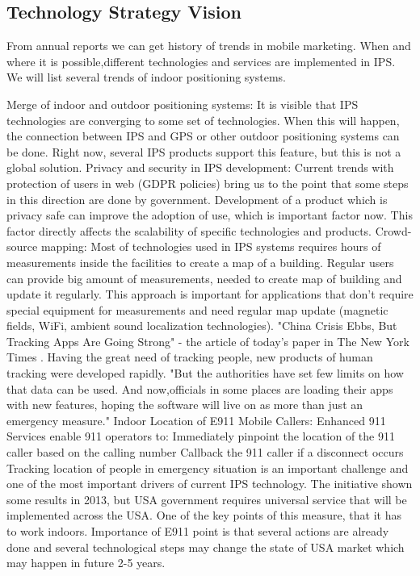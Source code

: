 


\subsection{Technology Strategy Vision}


From annual reports\cite{trends2017,trends2019} we can get history of trends in mobile marketing. When and where it is possible,different technologies and services are implemented in IPS. We will list several trends of indoor positioning systems.


Merge of indoor and outdoor positioning systems:
It is visible that IPS technologies are converging to some set of technologies. When this will happen, the connection between IPS and GPS or other outdoor positioning systems can be done. Right now, several IPS products support this feature, but this is not a global solution.\cite{Brena2017}
Privacy and security in IPS development:
Current trends with protection of users in web (GDPR policies) bring us to the point that some steps in this direction are done by government. Development of a product which is privacy safe can improve the adoption of use, which is important factor now. This factor directly affects the scalability of specific technologies and products.\cite{Brena2017}
Crowd-source mapping:
Most of technologies used in IPS systems requires hours of measurements inside the facilities to create a map of a building. Regular users can provide big amount of measurements, needed to create map of building and update it regularly.  This approach is important for applications that don't require special equipment for measurements and need regular map update (magnetic fields, WiFi, ambient sound localization technologies).\cite{Brena2017}
"China Crisis Ebbs, But Tracking Apps Are Going Strong" - the article of today's paper in The New York Times \cite{Tracking_Apps_times}.
Having the great need of tracking people, new products of human tracking were developed rapidly. "But the authorities have set few limits on how that data can be used. And now,officials in some places are loading their apps with new features, hoping the software will live on as more than just an emergency measure."
Indoor Location of E911 Mobile Callers:
Enhanced 911 Services enable 911 operators to:
Immediately pinpoint the location of the 911 caller based on the calling number
Callback the 911 caller if a disconnect occurs
Tracking location of people in emergency situation is an important challenge and one of the most important drivers of current IPS technology.
The initiative shown some results in 2013, but USA government requires universal service that will be implemented across the USA. One of the key points of this measure, that it has to work indoors. Importance of E911 point is that several actions are already done and several technological steps may change the state of USA market which may happen in future 2-5 years.

